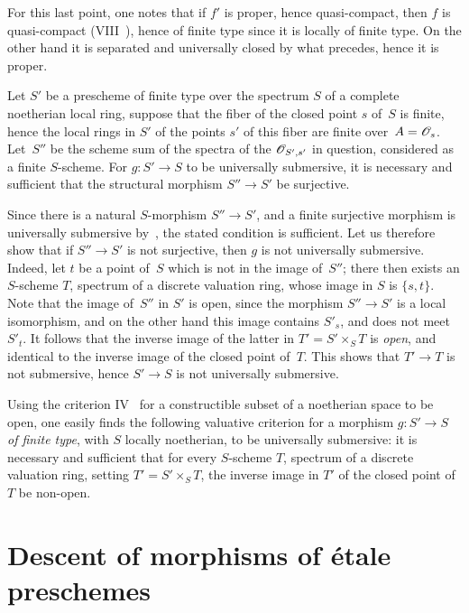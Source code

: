 For this last point, one notes that if $f'$ is proper, hence
quasi-compact, then $f$ is quasi-compact (VIII~), hence
of finite type since it is locally of finite type. On the other hand
it is separated and universally closed by what
precedes, hence it is proper.
\begin{proposition}
\label{IX.2.5}
Let $S'$ be a prescheme of finite type over the spectrum $S$ of a
complete noetherian local ring, suppose that the fiber of the closed
point $s$ of~$S$ is finite, hence the local rings in $S'$ of the
points $s'$ of this fiber are finite over~$A=\cal{O}_s$. Let~$S''$ be the
scheme sum of the spectra of the $\cal{O}_{S',s'}$ in question,
considered as a finite $S$-scheme. For $g\colon S' \to
S$ to be universally submersive, it is necessary and sufficient that the
structural morphism $S''\to S'$ be surjective.
\end{proposition}

Since there is a natural $S$-morphism $S'' \to S'$, and a
finite surjective morphism is universally submersive by~,
the stated condition is sufficient. Let us therefore show that if
$S''\to S'$ is not surjective, then $g$ is not universally
submersive. Indeed, let $t$ be a point of~$S$ which is not in
the image of~$S''$; there then exists an $S$-scheme $T$, spectrum of a
discrete valuation ring, whose image in $S$ is
$\{s,t\}$. Note that the image of~$S''$ in $S'$ is open, since the
morphism $S'' \to S'$ is a local isomorphism, and on the other hand
this image contains $S'_s$, and does not meet $S'_t$. It follows
that the inverse image of the latter in $T'=S'\times_S T$ is
\emph{open}, and identical to the inverse image of the closed point
of~$T$. This shows that $T'\to T$ is not submersive, hence $S'\to S$
is not universally submersive.
\begin{remark}
\label{IX.2.6}
Using the criterion IV~ for a constructible subset of
a noetherian space to be open, one easily finds the following
valuative criterion for a morphism
$g\colon S'\to S$ \emph{of finite type}, with $S$ locally
noetherian, to be universally submersive: it is necessary and sufficient
that for every $S$-scheme $T$, spectrum of a discrete valuation
ring, setting $T'=S'\times_S T$, the inverse image in $T'$ of the
closed point of~$T$ be non-open.
\end{remark}

\section{Descent of morphisms of \'etale preschemes}
\label{IX.3}


